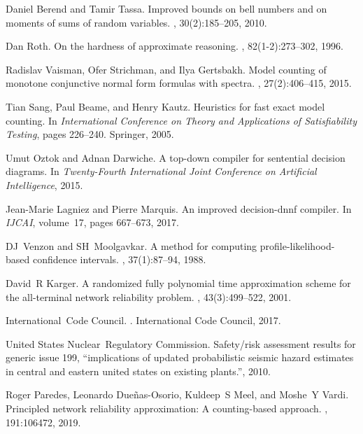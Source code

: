 \documentclass[12pt,twocolumn]{article}
\begin{document}
{\begin{thebibliography}{10}
Daniel Berend and Tamir Tassa.
\newblock Improved bounds on bell numbers and on moments of sums of random
  variables.
, 30(2):185--205, 2010.

Dan Roth.
\newblock On the hardness of approximate reasoning.
, 82(1-2):273--302, 1996.

Radislav Vaisman, Ofer Strichman, and Ilya Gertsbakh.
\newblock Model counting of monotone conjunctive normal form formulas with
  spectra.
, 27(2):406--415, 2015.

Tian Sang, Paul Beame, and Henry Kautz.
\newblock Heuristics for fast exact model counting.
\newblock In {\em International Conference on Theory and Applications of
  Satisfiability Testing}, pages 226--240. Springer, 2005.

Umut Oztok and Adnan Darwiche.
\newblock A top-down compiler for sentential decision diagrams.
\newblock In {\em Twenty-Fourth International Joint Conference on Artificial
  Intelligence}, 2015.

Jean-Marie Lagniez and Pierre Marquis.
\newblock An improved decision-dnnf compiler.
\newblock In {\em IJCAI}, volume~17, pages 667--673, 2017.

DJ~Venzon and SH~Moolgavkar.
\newblock A method for computing profile-likelihood-based confidence intervals.
, 37(1):87--94, 1988.

David~R Karger.
\newblock A randomized fully polynomial time approximation scheme for the
  all-terminal network reliability problem.
, 43(3):499--522, 2001.

International~Code Council.
.
\newblock International Code Council, 2017.

United States Nuclear~Regulatory Commission.
\newblock Safety/risk assessment results for generic issue 199, “implications
  of updated probabilistic seismic hazard estimates in central and eastern
  united states on existing plants.”, 2010.

Roger Paredes, Leonardo Due{\~n}as-Osorio, Kuldeep~S Meel, and Moshe~Y Vardi.
\newblock Principled network reliability approximation: A counting-based
  approach.
, 191:106472, 2019.


\end{thebibliography}}
\end{document}
